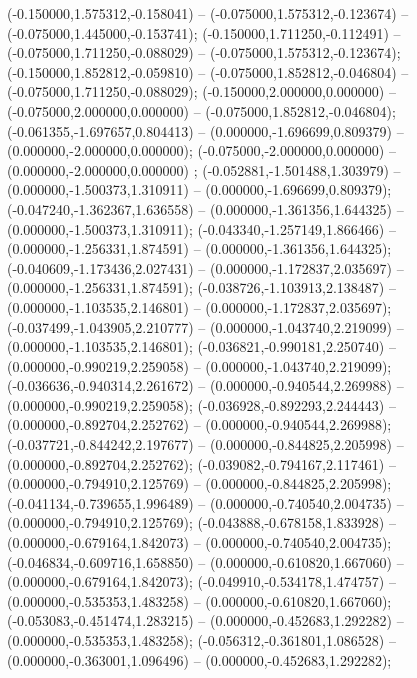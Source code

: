  (-0.150000,1.575312,-0.158041) -- (-0.075000,1.575312,-0.123674) -- (-0.075000,1.445000,-0.153741);
 (-0.150000,1.711250,-0.112491) -- (-0.075000,1.711250,-0.088029) -- (-0.075000,1.575312,-0.123674);
 (-0.150000,1.852812,-0.059810) -- (-0.075000,1.852812,-0.046804) -- (-0.075000,1.711250,-0.088029);
 (-0.150000,2.000000,0.000000) -- (-0.075000,2.000000,0.000000) -- (-0.075000,1.852812,-0.046804);
 (-0.061355,-1.697657,0.804413) -- (0.000000,-1.696699,0.809379) -- (0.000000,-2.000000,0.000000);
 (-0.075000,-2.000000,0.000000) -- (0.000000,-2.000000,0.000000) ;
 (-0.052881,-1.501488,1.303979) -- (0.000000,-1.500373,1.310911) -- (0.000000,-1.696699,0.809379);
 (-0.047240,-1.362367,1.636558) -- (0.000000,-1.361356,1.644325) -- (0.000000,-1.500373,1.310911);
 (-0.043340,-1.257149,1.866466) -- (0.000000,-1.256331,1.874591) -- (0.000000,-1.361356,1.644325);
 (-0.040609,-1.173436,2.027431) -- (0.000000,-1.172837,2.035697) -- (0.000000,-1.256331,1.874591);
 (-0.038726,-1.103913,2.138487) -- (0.000000,-1.103535,2.146801) -- (0.000000,-1.172837,2.035697);
 (-0.037499,-1.043905,2.210777) -- (0.000000,-1.043740,2.219099) -- (0.000000,-1.103535,2.146801);
 (-0.036821,-0.990181,2.250740) -- (0.000000,-0.990219,2.259058) -- (0.000000,-1.043740,2.219099);
 (-0.036636,-0.940314,2.261672) -- (0.000000,-0.940544,2.269988) -- (0.000000,-0.990219,2.259058);
 (-0.036928,-0.892293,2.244443) -- (0.000000,-0.892704,2.252762) -- (0.000000,-0.940544,2.269988);
 (-0.037721,-0.844242,2.197677) -- (0.000000,-0.844825,2.205998) -- (0.000000,-0.892704,2.252762);
 (-0.039082,-0.794167,2.117461) -- (0.000000,-0.794910,2.125769) -- (0.000000,-0.844825,2.205998);
 (-0.041134,-0.739655,1.996489) -- (0.000000,-0.740540,2.004735) -- (0.000000,-0.794910,2.125769);
 (-0.043888,-0.678158,1.833928) -- (0.000000,-0.679164,1.842073) -- (0.000000,-0.740540,2.004735);
 (-0.046834,-0.609716,1.658850) -- (0.000000,-0.610820,1.667060) -- (0.000000,-0.679164,1.842073);
 (-0.049910,-0.534178,1.474757) -- (0.000000,-0.535353,1.483258) -- (0.000000,-0.610820,1.667060);
 (-0.053083,-0.451474,1.283215) -- (0.000000,-0.452683,1.292282) -- (0.000000,-0.535353,1.483258);
 (-0.056312,-0.361801,1.086528) -- (0.000000,-0.363001,1.096496) -- (0.000000,-0.452683,1.292282);

